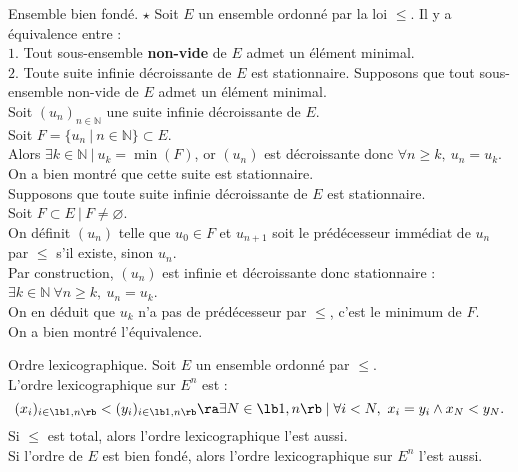 \documentclass[french, 11pt]{article}
\begin{document}
\begin{prop}{Ensemble bien fondé. $\star$}{}
    Soit $E$ un ensemble ordonné par la loi $\leq$. Il y a équivalence entre :\\
    \hspace*{2em}$1.$ Tout sous-ensemble \textbf{non-vide} de $E$ admet un élément minimal.\\
    \hspace*{2em}$2.$ Toute suite infinie décroissante de $E$ est stationnaire.
    \tcblower
    \fbox{$\ra$} Supposons que tout sous-ensemble non-vide de $E$ admet un élément minimal.\\
    Soit $(u_n)_{n\in\mathbb{N}}$ une suite infinie décroissante de $E$.\\
    Soit $F=\{u_n ~ | ~ n \in \mathbb{N}\}\subset E$.\\
    Alors $\exists k \in \mathbb{N} ~ | ~ u_k = \min(F)$, or $(u_n)$ est décroissante donc $\forall n \geq k, ~ u_n = u_k$.\\
    On a bien montré que cette suite est stationnaire.\\[0.2cm]
    \fbox{$\la$} Supposons que toute suite infinie décroissante de $E$ est stationnaire.\\
    Soit $F\subset E ~ | ~ F \neq \varnothing$.\\
    On définit $(u_n)$ telle que $u_0 \in F$ et $u_{n+1}$ soit le prédécesseur immédiat de $u_n$ par $\leq$ s'il existe, sinon $u_n$.\\
    Par construction, $(u_n)$ est infinie et décroissante donc stationnaire : $\exists k \in \mathbb{N} ~ \forall n \geq k, ~ u_n = u_k$.\\
    On en déduit que $u_k$ n'a pas de prédécesseur par $\leq$, c'est le minimum de $F$.\\
    On a bien montré l'équivalence.
\end{prop}

\pagebreak

\begin{prop}{Ordre lexicographique.}{}
    Soit $E$ un ensemble ordonné par $\leq$.\\
    L'ordre lexicographique sur $E^n$ est :
    \begin{equation*}
        (x_i)_{i\in\lb1,n\rb} < (y_i)_{i\in\lb1,n\rb} \ra \exists N \in \lb1,n\rb \mid \forall i < N, ~ x_i = y_i \land x_N < y_N.
    \end{equation*}
    Si $\leq$ est total, alors l'ordre lexicographique l'est aussi.\\
    Si l'ordre de $E$ est bien fondé, alors l'ordre lexicographique sur $E^n$ l'est aussi.
\end{prop}
\end{document}
